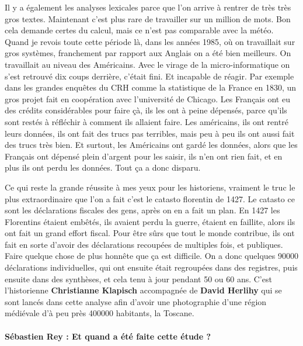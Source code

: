 Il y a également les analyses lexicales parce que l'on arrive à rentrer de très très gros textes. Maintenant c'est plus rare de travailler sur un million de mots. Bon cela demande certes du calcul, mais ce n'est pas comparable avec la météo. 
Quand je revois toute cette période là, dans les années 1985, où on travaillait sur gros systèmes, franchement par rapport aux Anglais on a été bien meilleurs. On travaillait au niveau des Américains. Avec le virage de la micro-informatique on s'est retrouvé dix coups derrière, c'était fini. Et incapable de réagir. Par exemple dans les grandes enquêtes du CRH comme la statistique de la France en 1830, un gros projet fait en coopération avec l'université de Chicago. Les Français ont eu des crédits considérables pour faire çà, ils les ont à peine dépensés, parce qu'ils sont restés à réfléchir à comment ils allaient faire. Les américains, ils ont rentré leurs données, ils ont fait des trucs pas terribles, mais peu à peu ils ont aussi fait des trucs très bien. Et surtout, les Américains ont gardé les données, alors que les Français ont dépensé plein d'argent pour les saisir, ils n'en ont rien fait, et en plus ils ont perdu les données. Tout ça a donc disparu. 

Ce qui reste la grande réussite à mes yeux pour les historiens, vraiment le truc le plus extraordinaire que l'on a fait c'est le catasto florentin de 1427. Le catasto ce sont les déclarations fiscales des gens, après on en a fait un plan. En 1427 les Florentins étaient embêtés, ils avaient perdu la guerre, étaient en faillite, alors ils ont fait un grand effort fiscal. Pour être sûrs que tout le monde contribue, ils ont fait en sorte d'avoir des déclarations recoupées de multiples fois, et publiques. Faire quelque chose de plus honnête que ça est difficile. On a donc quelques 90000 déclarations individuelles, qui ont ensuite était regroupées dans des registres, puis ensuite dans des synthèses, et cela tenu à jour pendant 50 ou 60 ans. C'est l'historienne \textbf{Christianne Klapisch} accompagnée de \textbf{David Herlihy} qui se sont lancés dans cette analyse afin d'avoir une photographie d'une région médiévale d'à peu près 400000 habitants, la Toscane.

\paragraph*{Sébastien Rey : Et quand a été faite cette étude ?}

